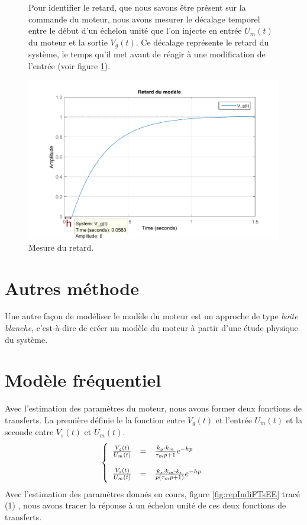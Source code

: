 \begin{figure}[!ht]
\begin{minipage}[t]{.5\textwidth}
\begin{flushleft}
Pour identifier le retard, que nous savons être présent sur la commande du moteur, nous avons mesurer le décalage temporel entre le début d'un échelon unité que l'on injecte en entrée $U_m(t)$ du moteur et la sortie $V_g(t)$. Ce décalage représente le retard du système, le temps qu'il met avant de réagir à une modification de l'entrée (voir figure \ref{fig:retardVg}).
\end{flushleft}
\end{minipage}%
\begin{minipage}[c]{.5\textwidth}
\centering
\includegraphics[width=\textwidth]{./I/images/retardVg.pdf}
\caption{\label{fig:retardVg} Mesure du retard.}
\end{minipage}
\end{figure}
	\section{Autres méthode}
Une autre façon de modéliser le modèle du moteur est un approche de type \emph{boite blanche}, c'est-à-dire de créer un modèle du moteur à partir d'une étude physique du système. 
	\section{Modèle fréquentiel}
Avec l'estimation des paramètres du moteur, nous avons former deux fonctions de transferts. La première définie le la fonction entre $V_g(t)$ et l'entrée $U_m(t)$ et la seconde entre $V_s(t)$ et $U_m(t)$. 
\begin{equation}
\left\lbrace
\begin{array}{l c l }
\frac{V_g(t)}{U_m(t)} 	&=& 	\frac{k_g \cdot k_m}{\tau_m p + 1	}e^{-hp}\\
&&\\
\frac{V_s(t)}{U_m(t)} 	&=& 	\frac{k_s \cdot k_m \cdot k_r}{ p\left(\tau_m p + 1\right)	}e^{-hp}\\
\end{array}
\right.
\end{equation}
Avec l'estimation des paramètres donnés en cours, figure \ref{fig:repIndiFTsEE} tracé (1) , nous avons tracer la réponse à un échelon unité de ces deux fonctions de transferts.
